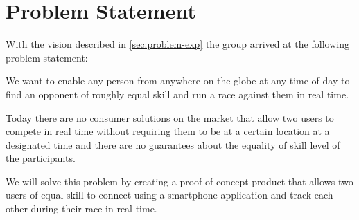 \section{Problem Statement}
With the vision described in \autoref{sec:problem-exp} the group arrived at the following problem statement: 

We want to enable any person from anywhere on the globe at any time of day to find an opponent of roughly equal skill and run a race against them in real time. 

Today there are no consumer solutions on the market that allow two users to compete in real time without requiring them to be at a certain location at a designated time and there are no guarantees about the equality of skill level of the participants.

We will solve this problem by creating a proof of concept product that allows two users of equal skill to connect using a smartphone application and track each other during their race in real time.